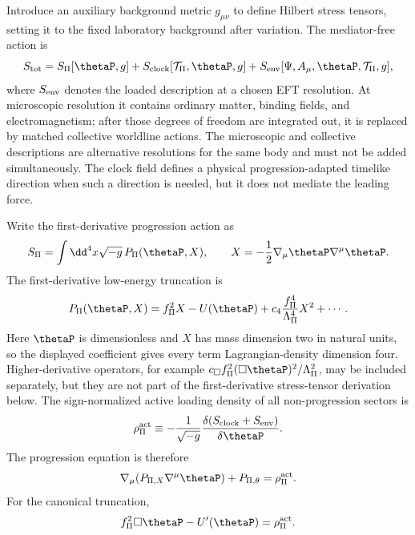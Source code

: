\documentclass[12pt]{article}
\begin{document}
Introduce an auxiliary background metric \(g_{\mu\nu}\) to define Hilbert stress tensors, setting it to the fixed laboratory background after variation.  The mediator-free action is
\begin{equation}
    S_{\rm tot}
    =S_\Pi[\thetaP,g]
    +S_{\rm clock}[\mathcal T_\Pi,\thetaP,g]
    +S_{\rm env}[\Psi,A_\mu,\thetaP,\mathcal T_\Pi,g],
    \label{eq:mediator-free-total-action}
\end{equation}
where \(S_{\rm env}\) denotes the loaded description at a chosen EFT resolution.  At microscopic resolution it contains ordinary matter, binding fields, and electromagnetism; after those degrees of freedom are integrated out, it is replaced by matched collective worldline actions.  The microscopic and collective descriptions are alternative resolutions for the same body and must not be added simultaneously.  The clock field defines a physical progression-adapted timelike direction when such a direction is needed, but it does not mediate the leading force.

Write the first-derivative progression action as
\begin{equation}
    S_\Pi=\int\dd^4x\sqrt{-g}\,P_\Pi(\thetaP,X),
    \qquad
    X=-\frac12\nabla_\mu\thetaP\nabla^\mu\thetaP .
    \label{eq:general-progression-action}
\end{equation}
The first-derivative low-energy truncation is
\begin{equation}
    P_\Pi(\thetaP,X)=f_\Pi^2X-U(\thetaP)
    +c_4\frac{f_\Pi^4}{\Lambda_\Pi^4}X^2+\cdots .
    \label{eq:canonical-progression-P}
\end{equation}
Here \(\thetaP\) is dimensionless and \(X\) has mass dimension two in natural units, so the displayed coefficient gives every term Lagrangian-density dimension four.  Higher-derivative operators, for example \(c_{\Box}f_\Pi^2(\Box\thetaP)^2/\Lambda_\Pi^2\), may be included separately, but they are not part of the first-derivative stress-tensor derivation below.
The sign-normalized active loading density of all non-progression sectors is
\begin{equation}
    \rho_\Pi^{\rm act}
    \equiv
    -\frac{1}{\sqrt{-g}}
    \frac{\delta(S_{\rm clock}+S_{\rm env})}{\delta\thetaP}.
    \label{eq:rho-active-total}
\end{equation}
The progression equation is therefore
\begin{equation}
    \nabla_\mu\!\left(P_{\Pi,X}\nabla^\mu\thetaP\right)
    +P_{\Pi,\theta}
    =\rho_\Pi^{\rm act}.
    \label{eq:general-progression-eom}
\end{equation}
For the canonical truncation,
\begin{equation}
    f_\Pi^2\Box\thetaP-U'(\thetaP)=\rho_\Pi^{\rm act}.
    \label{eq:canonical-progression-eom}
\end{equation}
\end{document}
